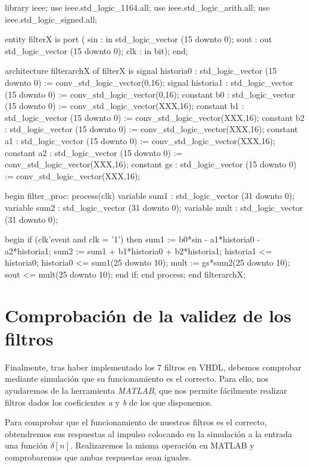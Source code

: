 \documentclass[a4paper,12pt]{report}
\begin{document}
\begin{vhdlcode}
library ieee;
use ieee.std_logic_1164.all;
use ieee.std_logic_arith.all;
use ieee.std_logic_signed.all;

entity filterX is
port (
    sin : in std_logic_vector (15 downto 0);
    sout : out std_logic_vector (15 downto 0);
    clk : in bit);
end;

architecture filterarchX of filterX is
    signal historia0 : std_logic_vector (15 downto 0) 
                := conv_std_logic_vector(0,16);
    signal historia1 : std_logic_vector (15 downto 0) 
                := conv_std_logic_vector(0,16);
    constant b0 : std_logic_vector (15 downto 0) 
                := conv_std_logic_vector(XXX,16);
    constant b1 : std_logic_vector (15 downto 0) 
                := conv_std_logic_vector(XXX,16);
    constant b2 : std_logic_vector (15 downto 0) 
                := conv_std_logic_vector(XXX,16);
    constant a1 : std_logic_vector (15 downto 0) 
                := conv_std_logic_vector(XXX,16);
    constant a2 : std_logic_vector (15 downto 0) 
                := conv_std_logic_vector(XXX,16);
    constant gs : std_logic_vector (15 downto 0) 
                := conv_std_logic_vector(XXX,16);

begin
    filter_proc: process(clk)
        variable sum1 : std_logic_vector (31 downto 0);
        variable sum2 : std_logic_vector (31 downto 0);
        variable mult : std_logic_vector (31 downto 0);

    begin
        if (clk'event and clk = '1') then
            sum1 := b0*sin - a1*historia0 - a2*historia1;
            sum2 := sum1 + b1*historia0 + b2*historia1;
            historia1 <= historia0;
            historia0 <= sum1(25 downto 10);
            mult := gs*sum2(25 downto 10);
            sout <= mult(25 downto 10);
        end if;
    end process;
end filterarchX;
\end{vhdlcode}
\clearpage

\section{Comprobación de la validez de los filtros}
Finalmente, tras haber implementado los 7 filtros en VHDL, debemos comprobar mediante simulación que su funcionamiento es el correcto. Para ello, nos ayudaremos de la herramienta \emph{MATLAB}, que nos permite fácilmente realizar filtros dados los coeficientes \emph{a} y \emph{b} de los que disponemos.

Para comprobar que el funcionamiento de nuestros filtros es el correcto, obtendremos sus respuestas al impulso colocando en la simulación a la entrada una función $\delta[n]$. Realizaremos la misma operación en MATLAB y comprobaremos que ambas respuestas sean iguales.
\end{document}
